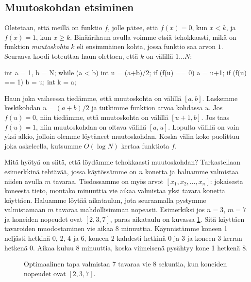 \subsection{Muutoskohdan etsiminen}

Oletetaan, että meillä on funktio $f$,
jolle pätee, että $f(x)=0$, kun $x<k$,
ja $f(x)=1$, kun $x \ge k$.
Binäärihaun avulla voimme etsiä tehokkaasti,
mikä on funktion \emph{muutoskohta} $k$
eli ensimmäinen kohta, jossa funktio saa arvon $1$.
Seuraava koodi toteuttaa haun olettaen,
että $k$ on välillä $1 \dots N$:


\begin{code}
int a = 1, b = N;
while (a < b) {
    int u = (a+b)/2;
    if (f(u) == 0) a = u+1;
    if (f(u) == 1) b = u;
}
int k = a;
\end{code}

Haun joka vaiheessa tiedämme, että muutoskohta on välillä $[a,b]$.
Laskemme keskikohdan $u=(a+b)/2$ ja tutkimme funktion arvoa kohdassa $u$.
Jos $f(u)=0$, niin tiedämme, että muutoskohta on välillä $[u+1,b]$.
Jos taas $f(u)=1$, niin muutoskohdan on oltava välillä $[a,u]$.
Lopulta välillä on vain yksi alkio, jolloin olemme löytäneet muutoskohdan.
Koska välin koko puolittuu joka askeleella,
kutsumme $O(\log N)$ kertaa funktiota $f$.

Mitä hyötyä on siitä, että löydämme tehokkaasti muutoskohdan?
Tarkastellaan esimerkkinä tehtävää, jossa käytössämme on $n$ konetta
ja haluamme valmistaa niiden avulla $m$ tavaraa.
Tiedossamme on myös arvot $[x_1,x_2,\dots,x_n]$:
jokaisesta koneesta tieto, montako minuuttia vie aikaa valmistaa
yksi tavara konetta käyttäen.
Haluamme löytää aikataulun, jota seuraamalla pystymme valmistamaan
$m$ tavaraa mahdollisimman nopeasti.
Esimerkiksi jos $n=3$, $m=7$ ja koneiden nopeudet ovat $[2,3,7]$,
paras aikataulu on kuvassa \ref{fig:optkon}.
Sitä käyttäen tavaroiden muodostaminen vie aikaa $8$ minuuttia.
Käynnistämme koneen 1 neljästi hetkinä 0, 2, 4 ja 6,
koneen 2 kahdesti hetkinä 0 ja 3
ja koneen 3 kerran hetkenä 0.
Aikaa kuluu $8$ minuuttia, koska viimeisenä pysähtyy kone 1 hetkenä 8.

\begin{figure}
\center
{}
\caption{Optimaalinen tapa valmistaa 7 tavaraa vie 8 sekuntia,
kun koneiden nopeudet ovat $[2,3,7]$.}
\label{fig:optkon}
\end{figure}

